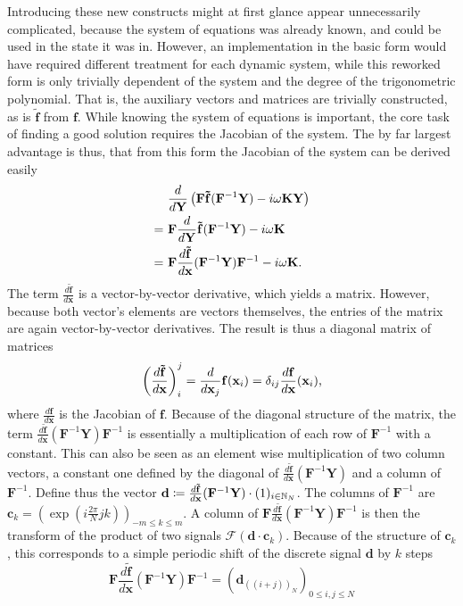 Introducing these new constructs might at first glance appear unnecessarily complicated, because the system of equations was already known, and could be used in the state it was in.
However, an implementation in the basic form would have required different treatment for each dynamic system, while this reworked form is only trivially dependent of the system and the degree of the trigonometric polynomial.
That is, the auxiliary vectors and matrices are trivially constructed, as is $\mathbf{\tilde f}$ from $\mathbf f$.
While knowing the system of equations is important, the core task of finding a good solution requires the Jacobian of the system.
The by far largest advantage is thus, that from this form the Jacobian of the system can be derived easily
	\begin{align*}
			& \frac{d}{d \mathbf Y} \left( \mathbf{F} \mathbf{\tilde f}(\mathbf{F}^{-1} \mathbf{Y}) - i \omega \mathbf K \mathbf Y \right) \\
		=\ & \mathbf{F} \frac{d}{d\mathbf Y}\mathbf{\tilde f}(\mathbf{F}^{-1} \mathbf{Y}) - i \omega \mathbf K \\ 
		=\ & \mathbf{F} \frac{d\mathbf{\tilde f}}{d\mathbf x}(\mathbf{F}^{-1} \mathbf{Y}) \mathbf{F}^{-1} - i \omega \mathbf K \text.
	\end{align*}
The term $\frac{d\mathbf{\tilde f}}{d\mathbf x}$ is a vector-by-vector derivative, which yields a matrix.
However, because both vector's elements are vectors themselves, the entries of the matrix are again vector-by-vector derivatives.
The result is thus a diagonal matrix of matrices
	\[
		\left(\frac{d\mathbf{\tilde f}}{d\mathbf x}\right)_i^j = \frac{d}{d\mathbf x_j} \mathbf f (\mathbf x_i) = \delta_{ij} \frac{d \mathbf f}{d\mathbf x}(\mathbf x_i) \text,
	\]
where $\frac{d \mathbf f}{d\mathbf x}$ is the Jacobian of $\mathbf f$.
Because of the diagonal structure of the matrix, the term $\frac{d\mathbf{\tilde f}}{d\mathbf x}(\mathbf{F}^{-1} \mathbf{Y}) \mathbf{F}^{-1}$ is essentially a multiplication of each row of $\mathbf F^{-1}$ with a constant.
This can also be seen as an element wise multiplication of two column vectors, a constant one defined by the diagonal of $\frac{d\mathbf{\tilde f}}{d\mathbf x}(\mathbf{F}^{-1} \mathbf{Y})$ and a column of $\mathbf F^{-1}$.
Define thus the vector $\mathbf d \coloneqq \frac{d\mathbf{\tilde f}}{d\mathbf x}(\mathbf{F}^{-1} \mathbf{Y}) \cdot (1)_{i \in \mathbb{N}_N}$.
The columns of $\mathbf F^{-1}$ are $\mathbf c_k = \left(\exp\left(i\frac{2\pi}{N} j k\right)\right)_{-m \le k \le m}$.
A column of $\mathbf{F} \frac{d\mathbf{\tilde f}}{d\mathbf x}(\mathbf{F}^{-1} \mathbf{Y}) \mathbf{F}^{-1}$ is then the transform of the product of two signals $\mathcal F(\mathbf d \cdot \mathbf c_k)$.
Because of the structure of $\mathbf c_k$, this corresponds to a simple periodic shift of the discrete signal $\mathbf d$ by $k$ steps
	\[
			\mathbf{F} \frac{d\mathbf{\tilde f}}{d\mathbf x}(\mathbf{F}^{-1} \mathbf{Y}) \mathbf{F}^{-1} = \left( \mathbf d_{((i+j))_N} \right)_{0 \le i,j \le N} 
	\]